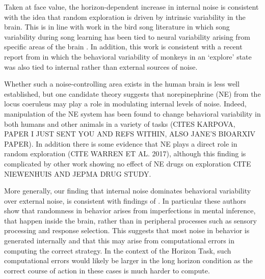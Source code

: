 \documentclass[12pt]{article}
\begin{document}
	Taken at face value, the horizon-dependent increase in internal noise is consistent with the idea that random exploration is driven by intrinsic variability in the brain. This is in line with work in the bird song literature in which song variability during song learning has been tied to neural variability arising from specific areas of the brain \citep{songbird1, songbird2}. In addition, this work is consistent with a recent report from \cite{ebitz17} in which the behavioral variability of monkeys in an `explore' state was also tied to internal rather than external sources of noise. 
	
	Whether such a noise-controlling area exists in the human brain is less well established, but one candidate theory \citep{aj2005} suggests that norepinephrine (NE) from the locus coeruleus may play a role in modulating internal levels of noise. Indeed, manipulation of the NE system has been found to change behavioral variability in both humans and other animals in a variety of tasks (CITES KARPOVA, PAPER I JUST SENT YOU AND REFS WITHIN, ALSO JANE'S BIOARXIV PAPER).  In addition there is some evidence that NE plays a direct role in random exploration (CITE WARREN ET AL. 2017), although this finding is complicated by other work showing no effect of NE drugs on exploration CITE NIEWENHUIS AND JEPMA DRUG STUDY.

	More generally, our finding that internal noise dominates behavioral variability over external noise, is consistent with findings of \cite{drugowitsch16}. In particular these authors show that randomness in behavior arises from imperfections in mental inference, that happen inside the brain, rather than in peripheral processes such as sensory processing and response selection. This suggests that most noise in behavior is generated internally and that this may arise from  computational errors in computing the correct strategy. In the context of the Horizon Task, such computational errors would likely be larger  in the long horizon condition as the correct course of action in these cases is much harder to compute.
	
	
\end{document}
